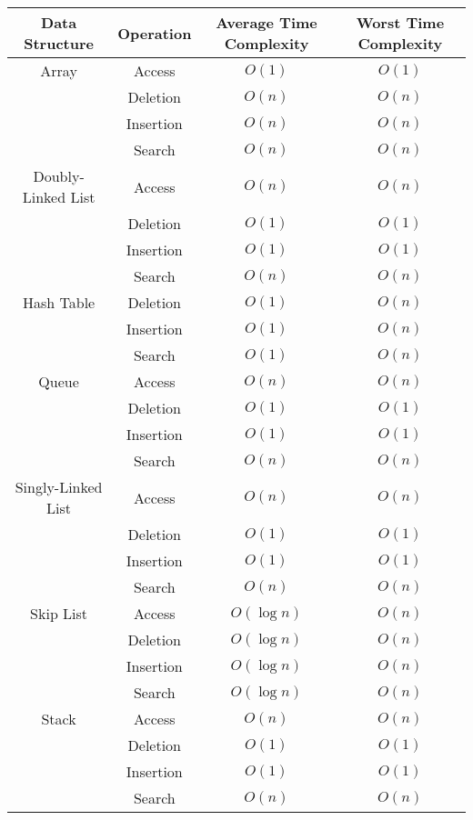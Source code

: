 \documentclass{article}
\begin{document}
\begin{table}[ht]
	\centering
	\scriptsize
	\begin{tabular}{c ccc}
		\textbf{Data Structure} & \textbf{Operation} & \textbf{Average Time Complexity} & \textbf{Worst Time Complexity} \\
		\hline
		Array & Access & $O(1)$ & $O(1)$  \\
		& Deletion & $O(n)$ & $O(n)$  \\
		& Insertion & $O(n)$ & $O(n)$  \\
		& Search & $O(n)$ & $O(n)$ \\
		\hline
		Doubly-Linked List & Access & $O(n)$ & $O(n)$  \\
		& Deletion & $O(1)$ & $O(1)$  \\
		& Insertion & $O(1)$ & $O(1)$  \\
		& Search & $O(n)$ & $O(n)$ \\
		\hline
		Hash Table & Deletion & $O(1)$ & $O(n)$ \\
		& Insertion & $O(1)$ & $O(n)$ \\
		& Search & $O(1)$ & $O(n)$ \\
		\hline
		Queue & Access & $O(n)$ & $O(n)$  \\
		& Deletion & $O(1)$ & $O(1)$  \\
		& Insertion & $O(1)$ & $O(1)$  \\
		& Search & $O(n)$ & $O(n)$  \\
		\hline
		Singly-Linked List & Access & $O(n)$ & $O(n)$  \\
		& Deletion & $O(1)$ & $O(1)$ \\
		& Insertion & $O(1)$ & $O(1)$ \\
		& Search & $O(n)$ & $O(n)$ \\
		\hline
		Skip List & Access & $O(\log{n})$ & $O(n)$ \\
		& Deletion & $O(\log{n})$ & $O(n)$ \\
		& Insertion & $O(\log{n})$ & $O(n)$ \\
		& Search & $O(\log{n})$ & $O(n)$ \\
		\hline
		Stack & Access & $O(n)$ & $O(n)$ \\
		& Deletion & $O(1)$ & $O(1)$ \\
		& Insertion & $O(1)$ & $O(1)$ \\
		& Search & $O(n)$ & $O(n)$ \\
		\hline
	\end{tabular}
\end{table}
\end{document}
